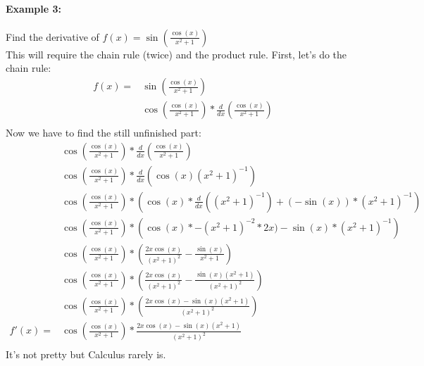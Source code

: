 \documentclass[../revisedmain.tex]{subfiles}
\begin{document}
\paragraph{Example 3:} Find the derivative of \(f(x)=\sin\left(\displaystyle\frac{\cos(x)}{x^2+1}\right)\)\\This will require the chain rule (twice) and the product rule. First, let's do the chain rule:
\begin{equation}
	\begin{split}
	f(x)=&\sin\left(\frac{\cos(x)}{x^2+1}\right)\\
	&\cos\left(\frac{\cos(x)}{x^2+1}\right)*\frac{d}{dx}\left(\frac{\cos(x)}{x^2+1}\right)\\
	\end{split}
\end{equation}
Now we have to find the still unfinished part:
\begin{equation}
	\begin{split}
	&\cos\left(\frac{\cos(x)}{x^2+1}\right)*\frac{d}{dx}\left(\frac{\cos(x)}{x^2+1}\right)\\
	&\cos\left(\frac{\cos(x)}{x^2+1}\right)*\frac{d}{dx}\left(\cos(x)(x^2+1)^{-1}\right)\\
	&\cos\left(\frac{\cos(x)}{x^2+1}\right)*\left(\cos(x)*\frac{d}{dx}\left((x^2+1)^{-1}\right)+(-\sin(x))*(x^2+1)^{-1}\right)\\
	&\cos\left(\frac{\cos(x)}{x^2+1}\right)*\left(\cos(x)*-(x^2+1)^{-2}*2x)-\sin(x)*(x^2+1)^{-1}\right)\\
	&\cos\left(\frac{\cos(x)}{x^2+1}\right)*\left(\frac{2x\cos(x)}{(x^2+1)^2}-\frac{\sin(x)}{x^2+1}\right)\\
	&\cos\left(\frac{\cos(x)}{x^2+1}\right)*\left(\frac{2x\cos(x)}{(x^2+1)^2}-\frac{\sin(x)(x^2+1)}{(x^2+1)^2}\right)\\
	&\cos\left(\frac{\cos(x)}{x^2+1}\right)*\left(\frac{2x\cos(x)-\sin(x)(x^2+1)}{(x^2+1)^2}\right)\\
	f'(x)=&\cos\left(\frac{\cos(x)}{x^2+1}\right)*\frac{2x\cos(x)-\sin(x)(x^2+1)}{(x^2+1)^2}\\
	\end{split}
\end{equation}
It's not pretty but Calculus rarely is.\\
\end{document}
